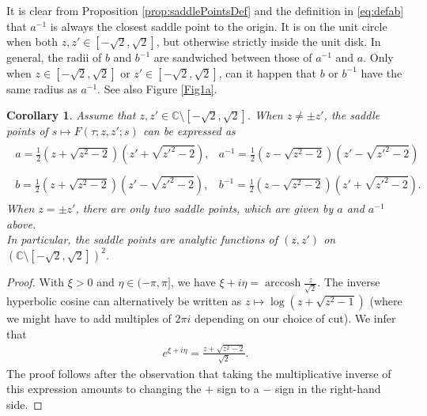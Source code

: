 \documentclass[%
 jmp,
cp,  %
 amsmath,amsthm,amssymb,%
 reprint,%
onecolumn]{revtex4-2}
\newtheorem{corollary}[theorem]{Corollary}
\begin{document}
It is clear from Proposition \ref{prop:saddlePointsDef} and the definition in \eqref{eq:defab} that $a^{-1}$ is always the closest saddle point to the origin. It is on the unit circle when both $z, z'\in [-\sqrt 2, \sqrt 2]$, but otherwise strictly inside the unit disk. In general, the radii of $b$ and $b^{-1}$ are sandwiched between those of $a^{-1}$ and $a$. Only when $z\in [-\sqrt 2, \sqrt 2]$ or $z'\in [-\sqrt 2, \sqrt 2]$, can it happen that $b$ or $b^{-1}$ have the same radius as $a^{-1}$. See also Figure \ref{Fig1a}.
\begin{corollary} \label{cor:saddleinZW}
Assume that $z, z'\in \mathbb C\setminus [-\sqrt 2, \sqrt 2]$.
When $z\neq\pm z'$, the saddle points of $s\mapsto F(\tau;z,z';s)$ can be expressed as
\begin{align}
\begin{array}{ll}
a = \frac{1}{2} \left(z+\sqrt{z^2-2}\right) \left(z'+\sqrt{z'^2-2}\right), & a^{-1} = \frac{1}{2} \left(z-\sqrt{z^2-2}\right) \left(z'-\sqrt{z'^2-2}\right) \\
{ } & { }\\
b = \frac{1}{2} \left(z+\sqrt{z^2-2}\right) \left(z'-\sqrt{z'^2-2}\right), & b^{-1} = \frac{1}{2} \left(z-\sqrt{z^2-2}\right) \left(z'+\sqrt{z'^2-2}\right).
\end{array}
\end{align}
When $z=\pm z'$, there are only two saddle points, which are given by $a$ and $a^{-1}$ above.\\
In particular, the saddle points are analytic functions of $(z,z')$ on $(\mathbb{C}\setminus [-\sqrt 2,\sqrt 2])^2$.\\
\end{corollary}

\begin{proof}
With $\xi >0$ and $\eta\in (-\pi,\pi]$, we have $\xi+i\eta = \operatorname{arccosh} \frac{z}{\sqrt 2}$. The inverse hyperbolic cosine can alternatively be written as $z\mapsto \log\left(z+\sqrt{z^2-1}\right)$ (where we might have to add multiples of $2\pi i$ depending on our choice of cut). We infer that
\begin{align}
e^{\xi+i\eta} = \frac{z+\sqrt{z^2-2}}{\sqrt 2}.
\end{align}
The proof follows after the observation that taking the multiplicative inverse of this expression amounts to changing the $+$ sign to a $-$ sign in the right-hand side.  
\end{proof}
\end{document}
